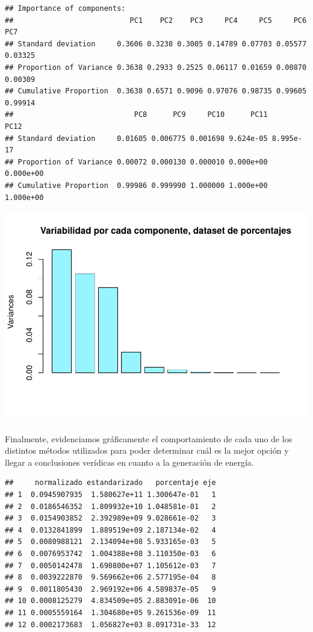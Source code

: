 \documentclass[
]{article}
\begin{document}
\begin{verbatim}
## Importance of components:
##                           PC1    PC2    PC3     PC4     PC5     PC6     PC7
## Standard deviation     0.3606 0.3238 0.3005 0.14789 0.07703 0.05577 0.03325
## Proportion of Variance 0.3638 0.2933 0.2525 0.06117 0.01659 0.00870 0.00309
## Cumulative Proportion  0.3638 0.6571 0.9096 0.97076 0.98735 0.99605 0.99914
##                            PC8      PC9     PC10      PC11      PC12
## Standard deviation     0.01605 0.006775 0.001698 9.624e-05 8.995e-17
## Proportion of Variance 0.00072 0.000130 0.000010 0.000e+00 0.000e+00
## Cumulative Proportion  0.99986 0.999990 1.000000 1.000e+00 1.000e+00
\end{verbatim}

\includegraphics{AMTV_Docum_Consolidado_files/figure-latex/unnamed-chunk-16-1.pdf}

Finalmente, evidenciamos gráficamente el comportamiento de cada uno de
los distintos métodos utilizados para poder determinar cuál es la mejor
opción y llegar a conclusiones verídicas en cuanto a la generación de
energía.

\begin{verbatim}
##     normalizado estandarizado   porcentaje eje
## 1  0.0945907935  1.580627e+11 1.300647e-01   1
## 2  0.0186546352  1.809932e+10 1.048581e-01   2
## 3  0.0154903852  2.392989e+09 9.028661e-02   3
## 4  0.0132841899  1.889519e+09 2.187134e-02   4
## 5  0.0080988121  2.134094e+08 5.933165e-03   5
## 6  0.0076953742  1.004388e+08 3.110350e-03   6
## 7  0.0050142478  1.690800e+07 1.105612e-03   7
## 8  0.0039222870  9.569662e+06 2.577195e-04   8
## 9  0.0011805430  2.969192e+06 4.589837e-05   9
## 10 0.0008125279  4.834509e+05 2.883091e-06  10
## 11 0.0005559164  1.304680e+05 9.261536e-09  11
## 12 0.0002173683  1.056827e+03 8.091731e-33  12
\end{verbatim}
\end{document}
